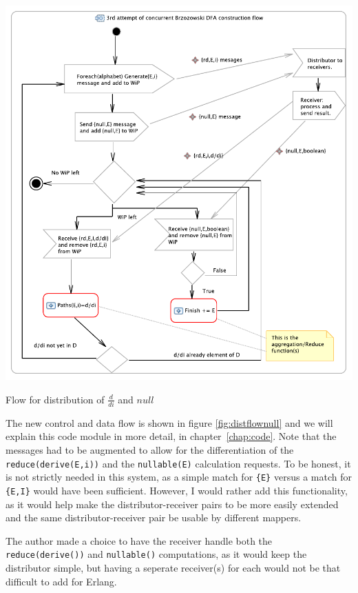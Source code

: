 \documentclass[a4paper,11pt]{report}
\begin{document}
\begin{Figure}[htb] %
	 \centering
	 \includegraphics[scale=1]{Activity-3null.pdf} 
	 \caption{Flow for distribution of $\frac{d}{di}$ and $null$}
	 \label{fig:distflownull}
\end{Figure}

The new control and data flow is shown in figure
\ref{fig:distflownull} and we will explain this code module in more
detail, in chapter~\ref{chap:code}. Note that the messages had to be
augmented to allow for the differentiation of the \sloppy
\texttt{reduce(derive(E,i))} and the \texttt{nullable(E)} calculation
requests. To be honest, it is not strictly needed in this system, as a
simple match for \texttt{\{E\}} versus a match for \texttt{\{E,I\}}
would have been sufficient.  However, I would rather add this
functionality, as it would help make the distributor-receiver pairs to
be more easily extended and the same distributor-receiver pair be
usable by different mappers.


The author made a choice to have the receiver handle both the
\texttt{reduce(derive())} and \texttt{nullable()} computations, as it
would keep the distributor simple, but having a seperate receiver(s) for
each would not be that difficult to add for Erlang.
\end{document}
